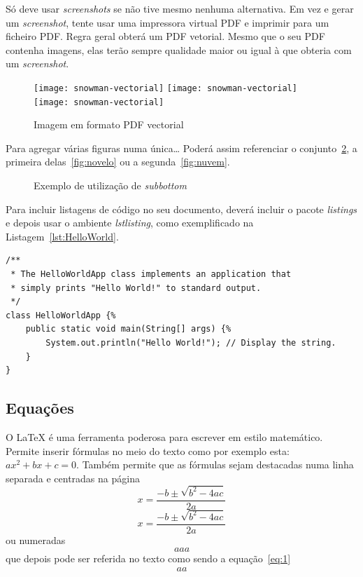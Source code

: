 Só deve usar \emph{screenshots} se não tive mesmo nenhuma alternativa.  Em vez e gerar um \emph{screenshot}, tente usar uma impressora virtual PDF e imprimir para um ficheiro PDF. Regra geral obterá um PDF vetorial. Mesmo que o seu PDF contenha imagens, elas terão sempre qualidade maior ou igual à que obteria com um \emph{screenshot}.

\begin{figure}[htbp]
	\centering
	\texttt{[image: snowman-vectorial]}
	\texttt{[image: snowman-vectorial]}
	\texttt{[image: snowman-vectorial]}
	\caption{Imagem em formato PDF vectorial}
	\label{fig:Figuras_Tree_silhouettes-vectorial}
\end{figure}

Para agregar várias figuras numa única… Poderá assim referenciar o conjunto~\ref{fig:figura-completa}, a primeira delas~\ref{fig:novelo} ou a segunda~\ref{fig:nuvem}.


\begin{figure}[htbp]
	\centering
\qquad\qquad
  \caption{Exemplo de utilização de \emph{subbottom}}
  \label{fig:figura-completa}
\end{figure}


Para incluir listagens de código no seu documento, deverá incluir o pacote \emph{listings} e depois usar o ambiente \emph{lstlisting}, como exemplificado na Listagem~\ref{lst:HelloWorld}.

\lstset{language=Java, caption=Hello World, label=lst:HelloWorld}
\begin{lstlisting}
/** 
 * The HelloWorldApp class implements an application that
 * simply prints "Hello World!" to standard output.
 */
class HelloWorldApp {%
    public static void main(String[] args) {%
        System.out.println("Hello World!"); // Display the string.
    }
}
\end{lstlisting}

\subsection{Equações}

O LaTeX é uma ferramenta poderosa para escrever em estilo matemático. Permite inserir fórmulas no meio do texto como por exemplo esta: $ax^2 + bx + c = 0$. Também permite que as fórmulas sejam destacadas numa linha separada e centradas na página 
$$x = \frac{-b \pm \sqrt{b^2-4ac}}{2a}$$
\[x = \frac{-b \pm \sqrt{b^2-4ac}}{2a}\]
ou numeradas 
\begin{equation}
aaa
\label{eq:1}
\end{equation}
que depois pode ser referida no texto como sendo a equação~\ref{eq:1}
$$\begin{array}{l}
aa
\end{array}
$$

